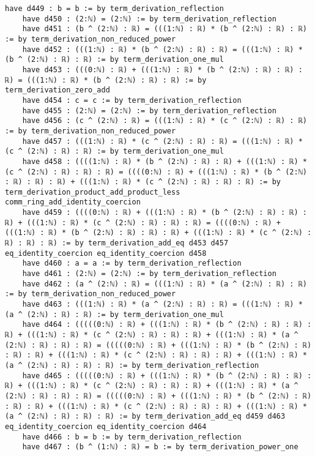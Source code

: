 \documentclass{article}
\begin{document}
\begin{tcolorbox}[colback=white!10, width=\linewidth]
\begin{lstlisting}[language=Lean4]
    have d449 : b = b := by term_derivation_reflection
    have d450 : (2:ℕ) = (2:ℕ) := by term_derivation_reflection
    have d451 : (b ^ (2:ℕ) : ℝ) = (((1:ℕ) : ℝ) * (b ^ (2:ℕ) : ℝ) : ℝ) := by term_derivation_non_reduced_power
    have d452 : (((1:ℕ) : ℝ) * (b ^ (2:ℕ) : ℝ) : ℝ) = (((1:ℕ) : ℝ) * (b ^ (2:ℕ) : ℝ) : ℝ) := by term_derivation_one_mul
    have d453 : (((0:ℕ) : ℝ) + (((1:ℕ) : ℝ) * (b ^ (2:ℕ) : ℝ) : ℝ) : ℝ) = (((1:ℕ) : ℝ) * (b ^ (2:ℕ) : ℝ) : ℝ) := by term_derivation_zero_add
    have d454 : c = c := by term_derivation_reflection
    have d455 : (2:ℕ) = (2:ℕ) := by term_derivation_reflection
    have d456 : (c ^ (2:ℕ) : ℝ) = (((1:ℕ) : ℝ) * (c ^ (2:ℕ) : ℝ) : ℝ) := by term_derivation_non_reduced_power
    have d457 : (((1:ℕ) : ℝ) * (c ^ (2:ℕ) : ℝ) : ℝ) = (((1:ℕ) : ℝ) * (c ^ (2:ℕ) : ℝ) : ℝ) := by term_derivation_one_mul
    have d458 : ((((1:ℕ) : ℝ) * (b ^ (2:ℕ) : ℝ) : ℝ) + (((1:ℕ) : ℝ) * (c ^ (2:ℕ) : ℝ) : ℝ) : ℝ) = ((((0:ℕ) : ℝ) + (((1:ℕ) : ℝ) * (b ^ (2:ℕ) : ℝ) : ℝ) : ℝ) + (((1:ℕ) : ℝ) * (c ^ (2:ℕ) : ℝ) : ℝ) : ℝ) := by term_derivation_product_add_product_less comm_ring_add_identity_coercion
    have d459 : ((((0:ℕ) : ℝ) + (((1:ℕ) : ℝ) * (b ^ (2:ℕ) : ℝ) : ℝ) : ℝ) + (((1:ℕ) : ℝ) * (c ^ (2:ℕ) : ℝ) : ℝ) : ℝ) = ((((0:ℕ) : ℝ) + (((1:ℕ) : ℝ) * (b ^ (2:ℕ) : ℝ) : ℝ) : ℝ) + (((1:ℕ) : ℝ) * (c ^ (2:ℕ) : ℝ) : ℝ) : ℝ) := by term_derivation_add_eq d453 d457 eq_identity_coercion eq_identity_coercion d458
    have d460 : a = a := by term_derivation_reflection
    have d461 : (2:ℕ) = (2:ℕ) := by term_derivation_reflection
    have d462 : (a ^ (2:ℕ) : ℝ) = (((1:ℕ) : ℝ) * (a ^ (2:ℕ) : ℝ) : ℝ) := by term_derivation_non_reduced_power
    have d463 : (((1:ℕ) : ℝ) * (a ^ (2:ℕ) : ℝ) : ℝ) = (((1:ℕ) : ℝ) * (a ^ (2:ℕ) : ℝ) : ℝ) := by term_derivation_one_mul
    have d464 : (((((0:ℕ) : ℝ) + (((1:ℕ) : ℝ) * (b ^ (2:ℕ) : ℝ) : ℝ) : ℝ) + (((1:ℕ) : ℝ) * (c ^ (2:ℕ) : ℝ) : ℝ) : ℝ) + (((1:ℕ) : ℝ) * (a ^ (2:ℕ) : ℝ) : ℝ) : ℝ) = (((((0:ℕ) : ℝ) + (((1:ℕ) : ℝ) * (b ^ (2:ℕ) : ℝ) : ℝ) : ℝ) + (((1:ℕ) : ℝ) * (c ^ (2:ℕ) : ℝ) : ℝ) : ℝ) + (((1:ℕ) : ℝ) * (a ^ (2:ℕ) : ℝ) : ℝ) : ℝ) := by term_derivation_reflection
    have d465 : (((((0:ℕ) : ℝ) + (((1:ℕ) : ℝ) * (b ^ (2:ℕ) : ℝ) : ℝ) : ℝ) + (((1:ℕ) : ℝ) * (c ^ (2:ℕ) : ℝ) : ℝ) : ℝ) + (((1:ℕ) : ℝ) * (a ^ (2:ℕ) : ℝ) : ℝ) : ℝ) = (((((0:ℕ) : ℝ) + (((1:ℕ) : ℝ) * (b ^ (2:ℕ) : ℝ) : ℝ) : ℝ) + (((1:ℕ) : ℝ) * (c ^ (2:ℕ) : ℝ) : ℝ) : ℝ) + (((1:ℕ) : ℝ) * (a ^ (2:ℕ) : ℝ) : ℝ) : ℝ) := by term_derivation_add_eq d459 d463 eq_identity_coercion eq_identity_coercion d464
    have d466 : b = b := by term_derivation_reflection
    have d467 : (b ^ (1:ℕ) : ℝ) = b := by term_derivation_power_one

\end{lstlisting}
\end{tcolorbox}
\end{document}
